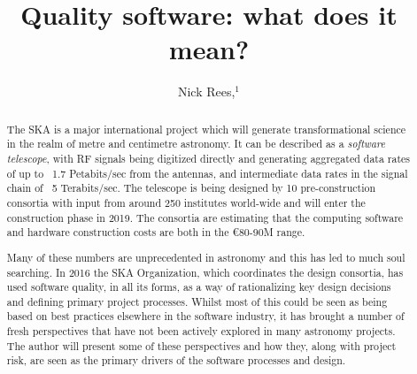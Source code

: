\documentclass[11pt,twoside]{article}
\begin{document}
\title{Quality software: what does it mean?}

\author{Nick Rees,$^1$
}


\begin{abstract}
The SKA is a major international project which will generate transformational science in the realm of metre and centimetre astronomy. It can be described as a \emph{software telescope}, with RF signals being digitized directly and generating aggregated data rates of up to ~1.7 Petabits/sec from the antennas, and intermediate data rates in the signal chain of ~5 Terabits/sec. The telescope is being designed by 10 pre-construction consortia with input from around 250 institutes world-wide and will enter the construction phase in 2019. The consortia are estimating that the computing software and hardware construction costs are both in the \euro80-90M range. 

Many of these numbers are unprecedented in astronomy and this has led to much soul searching. In 2016 the SKA Organization, which coordinates the design consortia, has used software quality, in all its forms, as a way of rationalizing key design decisions and defining primary project processes. Whilst most of this could be seen as being based on best practices elsewhere in the software industry, it has brought a number of fresh perspectives that have not been actively explored in many astronomy projects. The author will present some of these perspectives and how they, along with project risk, are seen as the primary drivers of the software processes and design.
\end{abstract}
\end{document}
